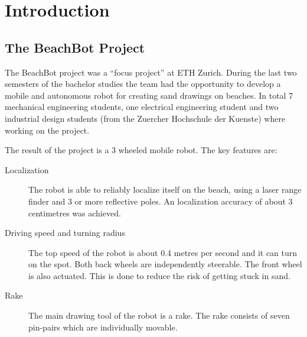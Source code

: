\chapter{Introduction}
\section{The BeachBot Project}
The BeachBot project was a \enquote{focus project} at ETH Zurich. During the last two semesters of the bachelor studies the team had the opportunity to develop a mobile and autonomous robot for creating sand drawings on beaches. In total 7 mechanical engineering students, one electrical engineering student and two industrial design students (from the Zuercher Hochschule der Kuenste) where working on the project. 

The result of the project is a 3 wheeled mobile robot. The key features are:
\begin{description}
\item[Localization] The robot is able to reliably localize itself on the beach, using a laser range finder and 3 or more reflective poles. An localization accuracy of about 3 centimetres was achieved.
\item[Driving speed and turning radius] The top speed of the robot is about 0.4 metres per second and it can turn on the spot. Both back wheels are independently steerable. The front wheel is also actuated. This is done to reduce the risk of getting stuck in sand.
\item[Rake] The main drawing tool of the robot is a rake. The rake consists of seven pin-pairs which are individually movable.
\end{description}

